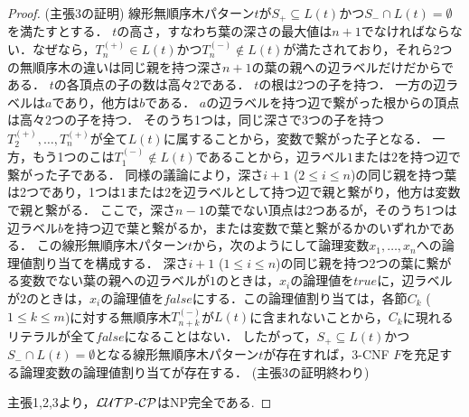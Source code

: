 \begin{proof}
\noindent
(主張3の証明)
線形無順序木パターン$t$が$S_{+}\subseteq L(t)$かつ$S_{-}\cap L(t)=\emptyset$を満たすとする．
$t$の高さ，すなわち葉の深さの最大値は$n+1$でなければならない．なぜなら，$T_{n}^{(+)}\in L(t)$かつ$T_{n}^{(-)}\not\in L(t)$が満たされており，それら2つの無順序木の違いは同じ親を持つ深さ$n+1$の葉の親への辺ラベルだけだからである．
$t$の各頂点の子の数は高々$2$である．
$t$の根は$2$つの子を持つ．
一方の辺ラベルは$a$であり，他方は$b$である．
$a$の辺ラベルを持つ辺で繋がった根からの頂点は高々$2$つの子を持つ．
そのうち1つは，同じ深さで$3$つの子を持つ$T_{2}^{(+)},\ldots,T_{n}^{(+)}$が全て$L(t)$に属することから，変数で繋がった子となる．
一方，もう1つのこは$T_{1}^{(-)}\not\in L(t)$であることから，辺ラベル$1$または$2$を持つ辺で繋がった子である．
同様の議論により，深さ$i+1$ ($2\leq i\leq n$)の同じ親を持つ葉は2つであり，1つは$1$または$2$を辺ラベルとして持つ辺で親と繋がり，他方は変数で親と繋がる．
ここで，深さ$n-1$の葉でない頂点は2つあるが，そのうち1つは辺ラベル$b$を持つ辺で葉と繋がるか，または変数で葉と繋がるかのいずれかである．
この線形無順序木パターン$t$から，次のようにして論理変数$x_{1},\ldots,x_{n}$への論理値割り当てを構成する．
深さ$i+1$ ($1\leq i\leq n$)の同じ親を持つ2つの葉に繋がる変数でない葉の親への辺ラベルが$1$のときは，$x_{i}$の論理値を$true$に，辺ラベルが$2$のときは，$x_{i}$の論理値を$false$にする．この論理値割り当ては，各節$C_{k}$ ($1\leq k\leq m$)に対する無順序木$T_{n+k}^{(-)}$が$L(t)$に含まれないことから，$C_{k}$に現れるリテラルが全て$false$になることはない．
したがって，$S_{+}\subseteq L(t)$かつ$S_{-}\cap L(t)=\emptyset$となる線形無順序木パターン$t$が存在すれば，3-CNF $F$を充足する論理変数の論理値割り当てが存在する．
(主張3の証明終わり)

\medskip

\noindent
主張1,2,3より，${\cal LUTP}$-${\cal CP}$はNP完全である.
\end{proof}

%